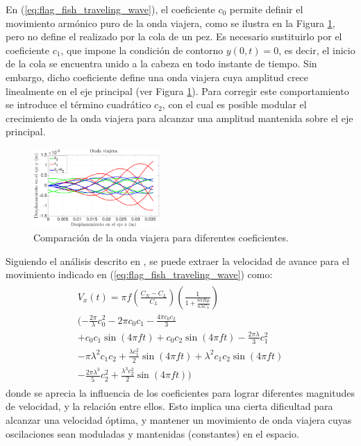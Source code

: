 En (\ref{eq:flag_fish_traveling_wave}), el coeficiente $c_0$ permite definir el movimiento armónico puro de la onda viajera, como se ilustra en la Figura \ref{fig:FC}, pero no define el realizado por la cola de un pez. Es necesario sustituirlo por el coeficiente $c_1$, que impone la condición de contorno $y(0,t) = 0$, es decir, el inicio de la cola se encuentra unido a la cabeza en todo instante de tiempo. Sin embargo, dicho coeficiente define una onda viajera cuya amplitud crece linealmente en el eje principal (ver Figura \ref{fig:FC}). Para corregir este comportamiento se introduce el término cuadrático $c_2$, con el cual es posible modular el crecimiento de la onda viajera para alcanzar una amplitud mantenida sobre el eje principal.
\begin{figure}[!h] %
	\vspace*{3mm}
    \centering
    \includegraphics[width=0.43\textwidth]{Figuras/FC}
  	\caption{Comparación de la onda viajera para diferentes coeficientes.}
  	\label{fig:FC}
\end{figure}

Siguiendo el análisis descrito en \cite{gray1955propulsion}, se puede extraer la velocidad de avance para el movimiento indicado en (\ref{eq:flag_fish_traveling_wave}) como:
\begin{eqnarray}
\label{eq:Vx_fish}
\begin{split}
	V_x (t)  =  \pi f\left( \frac{C_N - C_L}{C_L} \right) \left( \frac{1}{ 1 + \frac{6 \pi R \mu}{n \lambda C_L} }  \right)\\
(- \frac{2 \pi}{\lambda} c_0^2 - 2 \pi c_0 c_1 - \frac{4 \pi c_0 c_2}{3} \\ 
+ c_0 c_1 \sin \left( 4 \pi f t \right) + c_0 c_2 \sin \left( 4 \pi f t \right) - \frac{2 \pi \lambda}{3} c_1^2 \\
- \pi \lambda^2 c_1 c_2 + \frac{\lambda c_1^2}{2} \sin \left( 4 \pi f t \right) + \lambda^2 c_1 c_2 \sin \left( 4 \pi f t \right) \\
- \frac{2 \pi \lambda^3}{5} c_2^2 + \frac{\lambda^3 c_2^2}{2} \sin \left( 4 \pi f t \right) )
	 		\end{split}
\end{eqnarray}
donde se aprecia la influencia de los coeficientes para lograr diferentes magnitudes de velocidad, y la relación entre ellos. Esto implica una cierta dificultad para alcanzar una velocidad óptima, y mantener un movimiento de onda viajera cuyas oscilaciones sean moduladas y mantenidas (constantes) en el espacio.\\

